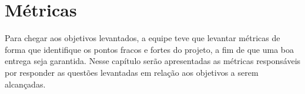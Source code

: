 \chapter{Métricas}
	
	Para chegar aos objetivos levantados, a equipe teve que levantar métricas de forma que identifique os pontos fracos e fortes do projeto, a fim de que uma boa entrega seja garantida.
	Nesse capítulo serão apresentadas as métricas responsáveis por responder as questões levantadas em relação aos objetivos a serem alcançadas.

	